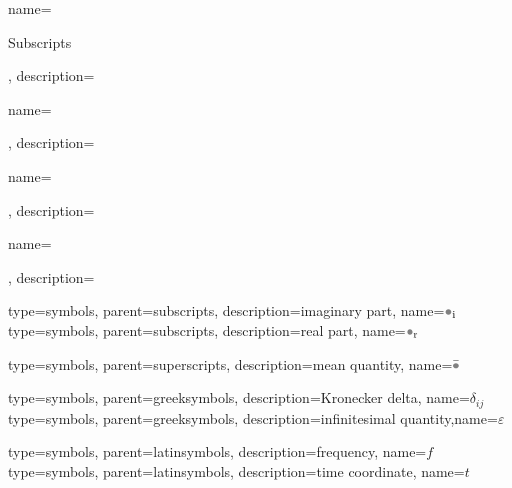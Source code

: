    {name={\parbox{\textwidth}{{Subscripts}\aftsymbgroup}},                 description={\nopostdesc}}
 {name={\parbox{\textwidth}{\aftsymbgroup}},  description={\nopostdesc}}
 {name={\parbox{\textwidth}{\aftsymbgroup}}, description={\nopostdesc}}
 {name={\parbox{\textwidth}{\aftsymbgroup}}, description={\nopostdesc}}

     {type=symbols, parent=subscripts,   description={imaginary part},        name={\ensuremath{\textcolor{ThesisDarkGrey}{\bullet}_{\textnormal{i}}}}}
     {type=symbols, parent=subscripts,   description={real part},             name={\ensuremath{\textcolor{ThesisDarkGrey}{\bullet}_{\textnormal{r}}}}}

    {type=symbols, parent=superscripts, description={mean quantity},         name={\ensuremath{\bar{\textcolor{ThesisDarkGrey}{\bullet}}}}}

 {type=symbols, parent=greeksymbols, description={Kronecker delta},       name={\ensuremath{\delta_{ij}}}}
 {type=symbols, parent=greeksymbols, description={infinitesimal quantity},name={\ensuremath{\varepsilon}}}

       {type=symbols, parent=latinsymbols, description={frequency},             name={\ensuremath{f}}}
       {type=symbols, parent=latinsymbols, description={time coordinate},       name={\ensuremath{t}}}
